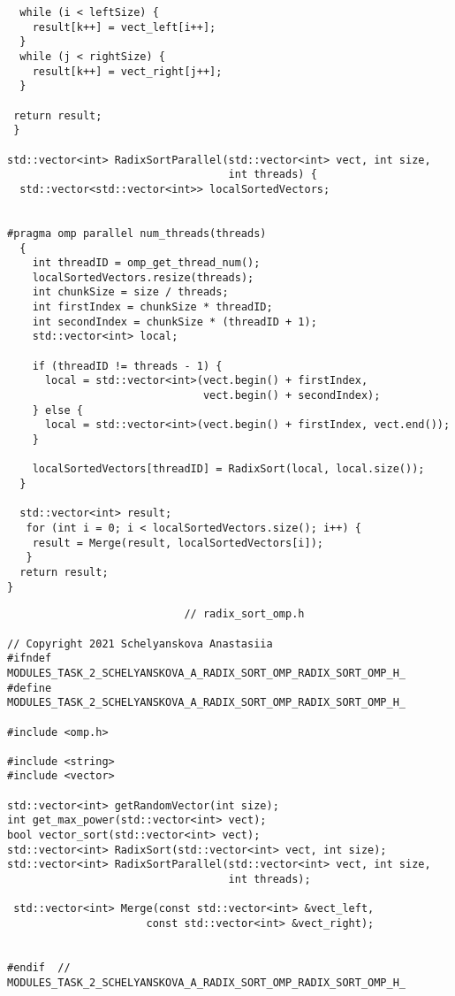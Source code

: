 \documentclass{report}
\begin{document}
\begin{lstlisting}
  while (i < leftSize) {
    result[k++] = vect_left[i++];
  }
  while (j < rightSize) {
    result[k++] = vect_right[j++];
  }

 return result;
 }

std::vector<int> RadixSortParallel(std::vector<int> vect, int size,
                                   int threads) {
  std::vector<std::vector<int>> localSortedVectors;


#pragma omp parallel num_threads(threads)
  {
    int threadID = omp_get_thread_num();
    localSortedVectors.resize(threads);
    int chunkSize = size / threads;
    int firstIndex = chunkSize * threadID;
    int secondIndex = chunkSize * (threadID + 1);
    std::vector<int> local;

    if (threadID != threads - 1) {
      local = std::vector<int>(vect.begin() + firstIndex,
                               vect.begin() + secondIndex);
    } else {
      local = std::vector<int>(vect.begin() + firstIndex, vect.end());
    }

    localSortedVectors[threadID] = RadixSort(local, local.size());
  }

  std::vector<int> result;
   for (int i = 0; i < localSortedVectors.size(); i++) {
    result = Merge(result, localSortedVectors[i]);
   }
  return result;
}

\end{lstlisting}
\begin{lstlisting}
							// radix_sort_omp.h

// Copyright 2021 Schelyanskova Anastasiia
#ifndef MODULES_TASK_2_SCHELYANSKOVA_A_RADIX_SORT_OMP_RADIX_SORT_OMP_H_
#define MODULES_TASK_2_SCHELYANSKOVA_A_RADIX_SORT_OMP_RADIX_SORT_OMP_H_

#include <omp.h>

#include <string>
#include <vector>

std::vector<int> getRandomVector(int size);
int get_max_power(std::vector<int> vect);
bool vector_sort(std::vector<int> vect);
std::vector<int> RadixSort(std::vector<int> vect, int size);
std::vector<int> RadixSortParallel(std::vector<int> vect, int size,
                                   int threads);

 std::vector<int> Merge(const std::vector<int> &vect_left,
                      const std::vector<int> &vect_right);


#endif  // MODULES_TASK_2_SCHELYANSKOVA_A_RADIX_SORT_OMP_RADIX_SORT_OMP_H_

\end{lstlisting}
\end{document}

